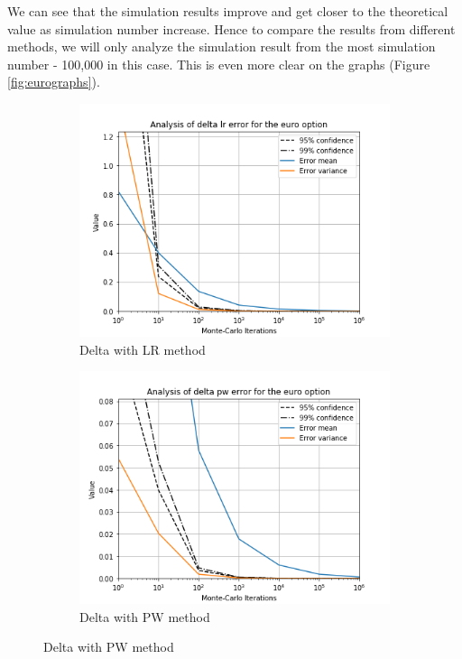 \documentclass[11pt,a4paper,fleqn]{article}
\begin{document}
We can see that the simulation results improve and get closer to the theoretical value as simulation number increase. Hence to compare the results from different methods, we will only analyze the simulation result from the most simulation number - 100,000 in this case. This is even more clear on the graphs (Figure \ref{fig:eurographs}).

\begin{figure}
  \centering
      \begin{subfigure}[b]{0.45\textwidth}
          \includegraphics[width=\textwidth]{graphs/eurodeltalr.png}
          \caption{Delta with LR method}
      \end{subfigure}
      \begin{subfigure}[b]{0.45\textwidth}
          \includegraphics[width=\textwidth]{graphs/eurodeltapw.png}
          \caption{Delta with PW method}
      \end{subfigure}


\end{figure}
\end{document}
